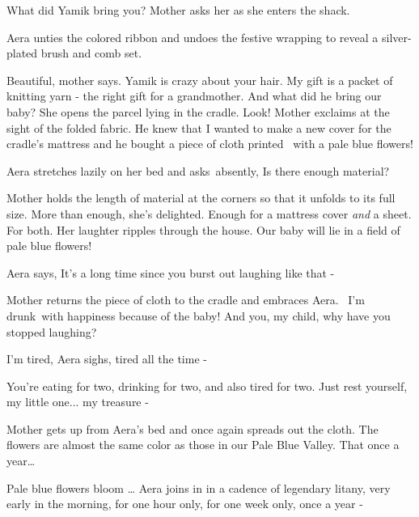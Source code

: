 \documentclass[letterpaper]{article}
\begin{document}
{\textquotedbl}What did Yamik bring you?{\textquotedbl} Mother asks her as she enters the shack. 

Aera unties the colored ribbon and undoes the festive wrapping to reveal a silver-plated brush and comb set.

{\textquotedbl}Beautiful,{\textquotedbl} mother says. {\textquotedbl}Yamik is crazy about your hair. My gift is a packet
of knitting yarn - the right gift for a grandmother. And what did he bring our baby?{\textquotedbl} She opens the
parcel lying in the cradle. {\textquotedbl}Look!{\textquotedbl} Mother exclaims at the sight of the folded fabric.
{\textquotedbl}He knew that I wanted to make a new cover for the cradle's mattress and he bought a piece of cloth
printed \ with a pale blue flowers!{\textquotedbl} 

Aera stretches lazily on her bed and asks~absently, {\textquotedbl}Is there enough material?{\textquotedbl}

Mother holds the length of material at the corners so that it unfolds to its full size. {\textquotedbl}More than
enough,{\textquotedbl} she's delighted. {\textquotedbl}Enough for a mattress cover \textit{and} a sheet. For
both.{\textquotedbl} Her laughter ripples through the house. {\textquotedbl}Our baby will lie in a field of pale blue
flowers!{\textquotedbl} 

Aera says, {\textquotedbl}It's a long time since you burst out laughing like that -{\textquotedbl} 

Mother returns the piece of cloth to the cradle and embraces Aera. ~{\textquotedbl}I'm drunk~with happiness because of
the baby! And you, my child, why have you stopped laughing?{\textquotedbl} 

{\textquotedbl}I'm tired,{\textquotedbl} Aera sighs, {\textquotedbl}tired all the time -{\textquotedbl} 

{\textquotedbl}You're eating for two, drinking for two, and also tired for two. Just rest yourself, my little one... my
treasure -{\textquotedbl}~ 

Mother gets up from Aera's bed and once again spreads out the cloth. {\textquotedbl}The flowers are almost the same
color as those in our Pale Blue Valley. That once a year{\dots}{\textquotedbl} 

{\textquotedbl}Pale blue flowers bloom {\dots}{\textquotedbl} Aera joins in in a cadence of legendary litany,
{\textquotedbl}very early in the morning, for one hour only, for one week only, once a year -{\textquotedbl}
\end{document}
